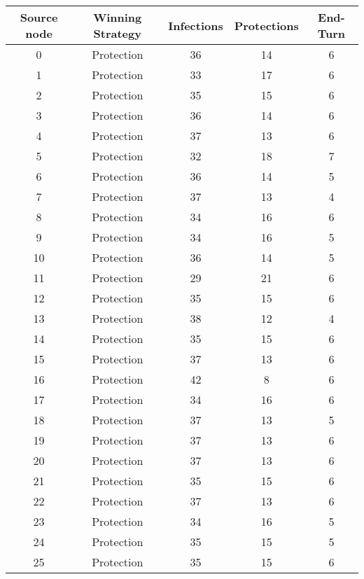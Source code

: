 \documentclass[results.tex]{subfiles}
\begin{document}
\begin{center}
  \begin{tabular}{| c || c | c | c | c |}
    \hline
    {\bfseries Source node} & {\bfseries Winning Strategy} & {\bfseries Infections} & {\bfseries Protections} & {\bfseries End-Turn} \\  %
    \hline\hline
    0 & Protection & 36 & 14 & 6 \\ 
    \hline
    1 & Protection & 33 & 17 & 6 \\ 
    \hline
    2 & Protection & 35 & 15 & 6 \\ 
    \hline
    3 & Protection & 36 & 14 & 6 \\ 
    \hline
    4 & Protection & 37 & 13 & 6 \\ 
    \hline
    5 & Protection & 32 & 18 & 7 \\ 
    \hline
    6 & Protection & 36 & 14 & 5 \\ 
    \hline
    7 & Protection & 37 & 13 & 4 \\ 
    \hline
    8 & Protection & 34 & 16 & 6 \\ 
    \hline
    9 & Protection & 34 & 16 & 5 \\ 
    \hline
    10 & Protection & 36 & 14 & 5 \\ 
    \hline
    11 & Protection & 29 & 21 & 6 \\ 
    \hline
    12 & Protection & 35 & 15 & 6 \\ 
    \hline
    13 & Protection & 38 & 12 & 4 \\ 
    \hline
    14 & Protection & 35 & 15 & 6 \\ 
    \hline
    15 & Protection & 37 & 13 & 6 \\ 
    \hline
    16 & Protection & 42 & 8 & 6 \\ 
    \hline
    17 & Protection & 34 & 16 & 6 \\ 
    \hline
    18 & Protection & 37 & 13 & 5 \\ 
    \hline
    19 & Protection & 37 & 13 & 6 \\ 
    \hline
    20 & Protection & 37 & 13 & 6 \\ 
    \hline
    21 & Protection & 35 & 15 & 6 \\ 
    \hline
    22 & Protection & 37 & 13 & 6 \\ 
    \hline
    23 & Protection & 34 & 16 & 5 \\ 
    \hline
    24 & Protection & 35 & 15 & 5 \\ 
    \hline
    25 & Protection & 35 & 15 & 6 \\ 

\end{tabular}
\end{center}
\end{document}
